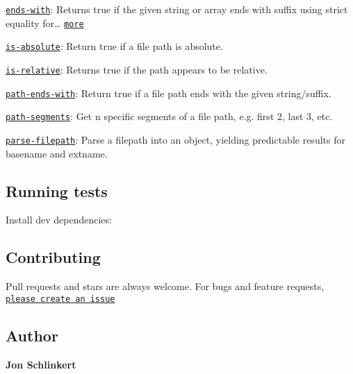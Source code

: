 \begin{DoxyItemize}
\item \href{https://github.com/jonschlinkert/ends-with}{\tt ends-\/with}\+: Returns {\ttfamily true} if the given {\ttfamily string} or {\ttfamily array} ends with {\ttfamily suffix} using strict equality for… \href{https://github.com/jonschlinkert/ends-with}{\tt more}
\item \href{https://github.com/jonschlinkert/is-absolute}{\tt is-\/absolute}\+: Return true if a file path is absolute.
\item \href{https://github.com/jonschlinkert/is-relative}{\tt is-\/relative}\+: Returns {\ttfamily true} if the path appears to be relative.
\item \href{https://github.com/jonschlinkert/path-ends-with}{\tt path-\/ends-\/with}\+: Return {\ttfamily true} if a file path ends with the given string/suffix.
\item \href{https://github.com/jonschlinkert/path-segments}{\tt path-\/segments}\+: Get n specific segments of a file path, e.\+g. first 2, last 3, etc.
\item \href{https://github.com/jonschlinkert/parse-filepath}{\tt parse-\/filepath}\+: Parse a filepath into an object, yielding predictable results for basename and extname.
\end{DoxyItemize}

\subsection*{Running tests}

Install dev dependencies\+:




\subsection*{Contributing}

Pull requests and stars are always welcome. For bugs and feature requests, \href{https://github.com/jonschlinkert/contains-path/issues/new}{\tt please create an issue}

\subsection*{Author}

{\bfseries Jon Schlinkert}


